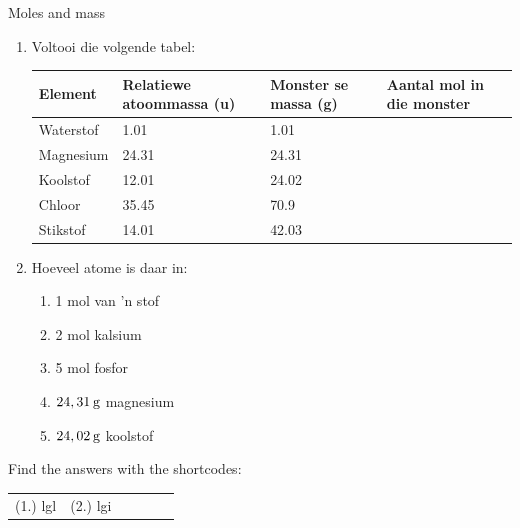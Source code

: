             \begin{exercises}{Moles and mass }
            \nopagebreak
      \label{m38717*id276067}\begin{enumerate}[noitemsep, label=\textbf{\arabic*}. ] 
\item Voltooi die volgende tabel:
          \begin{table}[H]
        \begin{center}
      \label{m38717*id276082}
    \noindent
      \begin{tabular}{|l|l|l|l|}\hline
\textbf{Element} & \textbf{Relatiewe atoommassa (u)} & \textbf{Monster se massa (g)} & \textbf{Aantal mol in die monster} \\ \hline
        Waterstof & 1.01 & 1.01 & \\ \hline
        Magnesium & 24.31 & 24.31 & \\ \hline
        Koolstof & 12.01 & 24.02 & \\ \hline
        Chloor & 35.45 & 70.9 & \\ \hline
        Stikstof & 14.01 & 42.03 & \\ \hline
    \end{tabular}
      \end{center}
\end{table}
    \par
          \label{m38717*uid3}\item 
Hoeveel atome is daar in:
\label{m38717*id276311}\begin{enumerate}[noitemsep, label=\textbf{\alph*}. ] 
            \label{m38717*uid4}\item 1 mol van 'n stof
\label{m38717*uid5}\item 2 mol kalsium
\label{m38717*uid6}\item 5 mol fosfor
\label{m38717*uid7}\item $24,31\phantom{\rule{2pt}{0ex}}\text{g}$ magnesium
\label{m38717*uid8}\item $24,02\phantom{\rule{2pt}{0ex}}\text{g}$ koolstof
\end{enumerate}
                \end{enumerate}
    \label{m38717*cid3}
\par {} Find the answers with the shortcodes:
 \par \begin{tabular}[h]{cccccc}
 (1.) lgl  &  (2.) lgi  & \end{tabular}
\end{exercises}
